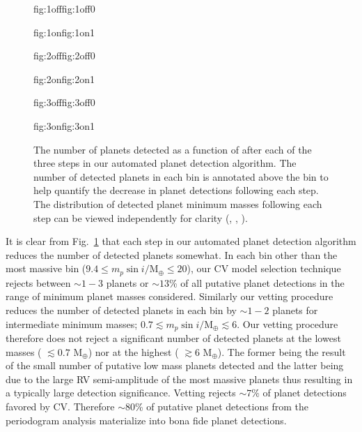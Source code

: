 \begin{figure}
  \centering
  \hspace{-\hsize}%
  \begin{ocg}{fig:1off}{fig:1off}{0}%
  \end{ocg}%
  \begin{ocg}{fig:1on}{fig:1on}{1}%
  \end{ocg}
  \hspace{-\hsize}%
  \begin{ocg}{fig:2off}{fig:2off}{0}%
  \end{ocg}%
  \begin{ocg}{fig:2on}{fig:2on}{1}%
  \end{ocg}
  \hspace{-\hsize}%
  \begin{ocg}{fig:3off}{fig:3off}{0}%
  \end{ocg}%
  \begin{ocg}{fig:3on}{fig:3on}{1}%
  \end{ocg}
  \hspace{-\hsize}%
  \caption{The number of planets detected as a function of \msini{} after each of the three steps in
    our automated planet detection algorithm. The number of detected planets in each
    \msini{} bin is annotated above the bin to help quantify the decrease in planet detections
    following each step. The distribution of detected planet minimum masses
    following each step can be viewed independently for clarity
    (,
    ,
    ).}
    \label{BSfig:detections}
\end{figure}

It is clear from Fig.~\ref{BSfig:detections} that each step in our automated planet detection algorithm
reduces the number of detected planets somewhat.
In each \msini{} bin other than the most massive bin ($9.4 \leq m_p\sin{i}/\text{M}_{\oplus} \leq 20$),
our CV model selection technique rejects between $\sim 1-3$ planets or
$\sim 13$\% of all putative planet detections in the range of minimum planet masses considered. Similarly
our vetting procedure reduces the number of detected planets in each \msini{} bin by $\sim 1-2$ planets
for intermediate minimum masses; $0.7 \lesssim m_p\sin{i}/\text{M}_{\oplus} \lesssim 6$.
Our vetting procedure therefore does not reject a significant number of detected
planets at the lowest masses (\msini{} $\lesssim 0.7$ M$_{\oplus}$) nor at the highest
(\msini{} $\gtrsim 6$ M$_{\oplus}$). The former being the result of the small number of putative low mass planets
detected and the latter being due to the large RV semi-amplitude of the most massive planets thus resulting
in a typically large detection significance. Vetting rejects $\sim 7$\% of planet detections favored by
CV. Therefore $\sim 80$\% of putative planet detections from the periodogram analysis materialize
into bona fide planet detections.


